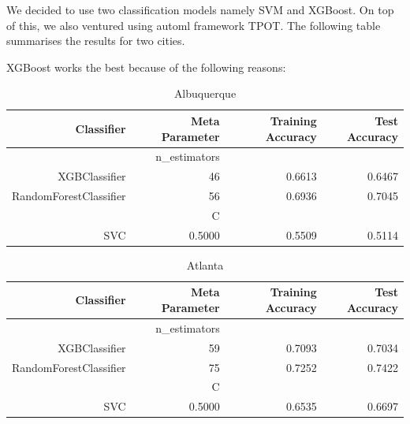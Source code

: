 \documentclass{article}
\begin{document}
We decided to use two classification models namely SVM and XGBoost. On top of
this, we also ventured using automl framework TPOT. The following table
summarises the results for two cities. \par
XGBoost works the best because of the following reasons:
\begin{table}[H]
    \caption{Albuquerque}
    \centering
    \begin{tabular}{|r|r|r|r|}
        \hline
        Classifier &Meta Parameter &Training Accuracy
        &Test Accuracy\\
        \hline
        &n\_estimators &\multicolumn{2}{|r|}{}\\
        \hline
        XGBClassifier &46 &0.6613 &0.6467\\
        \hline
        RandomForestClassifier &56 &0.6936 &0.7045\\
        \hline
        &C &\multicolumn{2}{|r|}{}\\
        \hline
        SVC &0.5000 &0.5509 &0.5114\\
        \hline
    \end{tabular}
\end{table}
\begin{table}[H]
    \caption{Atlanta}
    \centering
    \begin{tabular}{|r|r|r|r|}
        \hline
        Classifier &Meta Parameter &Training Accuracy
        &Test Accuracy\\
        \hline
        &n\_estimators &\multicolumn{2}{|r|}{}\\
        \hline
        XGBClassifier &59 &0.7093 &0.7034\\
        \hline
        RandomForestClassifier &75 &0.7252 &0.7422\\
        \hline
        &C &\multicolumn{2}{|r|}{}\\
        \hline
        SVC &0.5000 &0.6535 &0.6697\\
        \hline
    \end{tabular}
\end{table}
\end{document}
